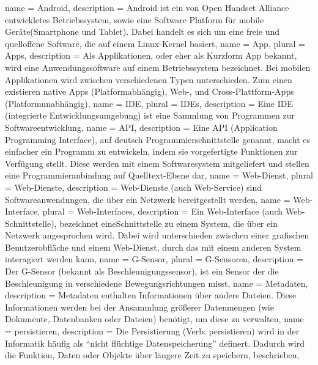 \newpage
\printglossaries
{}
{
  name = Android,
  description = {Android ist ein von Open Handset Alliance entwickletes Betriebssystem, sowie eine Software Platform für mobile Geräte(\gls{Smartphone} und \gls{Tablet}). Dabei handelt es sich um eine freie und quelloffene Software, die auf einem Linux-Kernel basiert},
}
{
  name = App,
  plural = Apps,
  description = {Als Applikationen, oder eher als Kurzform App bekannt, wird eine Anwendungssoftware auf einem Betriebssystem bezeichnet. Bei mobilen Applikationen wird zwischen verschiedenen Typen unterschieden. Zum einen existieren native Apps (Platformabhängig), Web-, und Cross-Plattform-Apps (Platformunabhängig)},
}
{
	name = IDE,
	plural = IDEs,
	description = {Eine IDE (integrierte Entwicklungsumgebung) ist eine Sammlung von Programmen zur Softwareentwicklung},
}
{
  name = API,
  description = {Eine API (Application Programming Interface), auf deutsch Programmierschnittstelle genannt, macht es einfacher ein Programm zu entwickeln, indem sie vorgefertigte Funktionen zur Verfügung stellt. Diese werden mit einem Softwaresystem mitgeliefert und stellen eine Programmieranbindung auf Quelltext-Ebene dar},
}
{
  name = Web-Dienst,
  plural = Web-Dienste,
  description = {Web-Dienste (auch Web-Service) sind Softwareanwendungen, die über ein Netzwerk bereitgestellt werden},
}
{
  name = Web-Interface,
  plural = Web-Interfaces,
  description = {Ein Web-Interface (auch Web-Schnittstelle), bezeichnet eine\linebreak Schnittstelle zu einem System, die über ein Netzwerk angesprochen wird. Dabei wird unterschieden zwischen einer grafischen Benutzerobfläche und einem \gls{Web-Dienst}, durch das mit einem anderen System interagiert werden kann},
}
{
  name = G-Sensor,
  plural = G-Sensoren,
  description = {Der G-Sensor (bekannt als Beschleunigungssensor), ist ein Sensor der die Beschleunigung in verschiedene Bewegungsrichtungen misst},
}
{
  name = Metadaten,
  description = {Metadaten enthalten Informationen über andere Dateien. Diese Informationen werden bei der Ansammlung größerer Datenmengen (wie Dokumente, Datenbanken oder Dateien) benötigt, um diese zu verwalten},
}
{
  name = persistieren,
  description = {Die Persistierung (Verb: persistieren) wird in der Informatik häufig als ``nicht flüchtige Datenspeicherung'' definert. Dadurch wird die Funktion, Daten oder Objekte über längere Zeit zu speichern, beschrieben},
}
